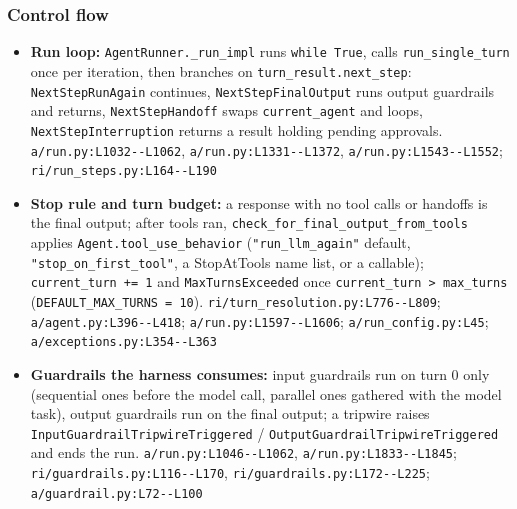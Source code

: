 \subsubsection*{Control flow}
\begin{itemize}
\item \textbf{Run loop:} \texttt{AgentRunner.\allowbreak{}\_\allowbreak{}run\_\allowbreak{}impl} runs \texttt{while True}, calls \texttt{run\_\allowbreak{}single\_\allowbreak{}turn} once per iteration, then branches on \texttt{turn\_\allowbreak{}result.\allowbreak{}next\_\allowbreak{}step}: \texttt{NextStepRunAgain} continues, \texttt{NextStepFinalOutput} runs output guardrails and returns, \texttt{NextStepHandoff} swaps \texttt{current\_\allowbreak{}agent} and loops, \texttt{NextStepInterruption} returns a result holding pending approvals. \texttt{a/\allowbreak{}run.\allowbreak{}py:\allowbreak{}L1032-\allowbreak{}-\allowbreak{}L1062}, \texttt{a/\allowbreak{}run.\allowbreak{}py:\allowbreak{}L1331-\allowbreak{}-\allowbreak{}L1372}, \texttt{a/\allowbreak{}run.\allowbreak{}py:\allowbreak{}L1543-\allowbreak{}-\allowbreak{}L1552}; \texttt{ri/\allowbreak{}run\_\allowbreak{}steps.\allowbreak{}py:\allowbreak{}L164-\allowbreak{}-\allowbreak{}L190}
\item \textbf{Stop rule and turn budget:} a response with no tool calls or handoffs is the final output; after tools ran, \texttt{check\_\allowbreak{}for\_\allowbreak{}final\_\allowbreak{}output\_\allowbreak{}from\_\allowbreak{}tools} applies \texttt{Agent.\allowbreak{}tool\_\allowbreak{}use\_\allowbreak{}behavior} (\texttt{"run\_\allowbreak{}llm\_\allowbreak{}again"} default, \texttt{"stop\_\allowbreak{}on\_\allowbreak{}first\_\allowbreak{}tool"}, a StopAtTools name list, or a callable); \texttt{current\_\allowbreak{}turn += 1} and \texttt{MaxTurnsExceeded} once \texttt{current\_\allowbreak{}turn > max\_\allowbreak{}turns} (\texttt{DEFAULT\_\allowbreak{}MAX\_\allowbreak{}TURNS = 10}). \texttt{ri/\allowbreak{}turn\_\allowbreak{}resolution.\allowbreak{}py:\allowbreak{}L776-\allowbreak{}-\allowbreak{}L809}; \texttt{a/\allowbreak{}agent.\allowbreak{}py:\allowbreak{}L396-\allowbreak{}-\allowbreak{}L418}; \texttt{a/\allowbreak{}run.\allowbreak{}py:\allowbreak{}L1597-\allowbreak{}-\allowbreak{}L1606}; \texttt{a/\allowbreak{}run\_\allowbreak{}config.\allowbreak{}py:\allowbreak{}L45}; \texttt{a/\allowbreak{}exceptions.\allowbreak{}py:\allowbreak{}L354-\allowbreak{}-\allowbreak{}L363}
\item \textbf{Guardrails the harness consumes:} input guardrails run on turn 0 only (sequential ones before the model call, parallel ones gathered with the model task), output guardrails run on the final output; a tripwire raises \texttt{InputGuardrailTripwireTriggered} / \texttt{OutputGuardrailTripwireTriggered} and ends the run. \texttt{a/\allowbreak{}run.\allowbreak{}py:\allowbreak{}L1046-\allowbreak{}-\allowbreak{}L1062}, \texttt{a/\allowbreak{}run.\allowbreak{}py:\allowbreak{}L1833-\allowbreak{}-\allowbreak{}L1845}; \texttt{ri/\allowbreak{}guardrails.\allowbreak{}py:\allowbreak{}L116-\allowbreak{}-\allowbreak{}L170}, \texttt{ri/\allowbreak{}guardrails.\allowbreak{}py:\allowbreak{}L172-\allowbreak{}-\allowbreak{}L225}; \texttt{a/\allowbreak{}guardrail.\allowbreak{}py:\allowbreak{}L72-\allowbreak{}-\allowbreak{}L100}

\end{itemize}

